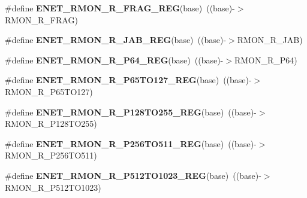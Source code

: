 \begin{DoxyCompactItemize}
\item 
\#define {\bfseries E\+N\+E\+T\+\_\+\+R\+M\+O\+N\+\_\+\+R\+\_\+\+F\+R\+A\+G\+\_\+\+R\+EG}(base)~((base)-\/$>$R\+M\+O\+N\+\_\+\+R\+\_\+\+F\+R\+AG)\hypertarget{group__ENET__Register__Accessor__Macros_gab2e82b83e09c4b55699908a92d7d95e4}{}\label{group__ENET__Register__Accessor__Macros_gab2e82b83e09c4b55699908a92d7d95e4}

\item 
\#define {\bfseries E\+N\+E\+T\+\_\+\+R\+M\+O\+N\+\_\+\+R\+\_\+\+J\+A\+B\+\_\+\+R\+EG}(base)~((base)-\/$>$R\+M\+O\+N\+\_\+\+R\+\_\+\+J\+AB)\hypertarget{group__ENET__Register__Accessor__Macros_gabcec6f14a6fb78aac07bd6245aa705af}{}\label{group__ENET__Register__Accessor__Macros_gabcec6f14a6fb78aac07bd6245aa705af}

\item 
\#define {\bfseries E\+N\+E\+T\+\_\+\+R\+M\+O\+N\+\_\+\+R\+\_\+\+P64\+\_\+\+R\+EG}(base)~((base)-\/$>$R\+M\+O\+N\+\_\+\+R\+\_\+\+P64)\hypertarget{group__ENET__Register__Accessor__Macros_gae8862aa6875b7d79e922251e3300b1d4}{}\label{group__ENET__Register__Accessor__Macros_gae8862aa6875b7d79e922251e3300b1d4}

\item 
\#define {\bfseries E\+N\+E\+T\+\_\+\+R\+M\+O\+N\+\_\+\+R\+\_\+\+P65\+T\+O127\+\_\+\+R\+EG}(base)~((base)-\/$>$R\+M\+O\+N\+\_\+\+R\+\_\+\+P65\+T\+O127)\hypertarget{group__ENET__Register__Accessor__Macros_ga245c663daff3ae4e24c1565a472beef0}{}\label{group__ENET__Register__Accessor__Macros_ga245c663daff3ae4e24c1565a472beef0}

\item 
\#define {\bfseries E\+N\+E\+T\+\_\+\+R\+M\+O\+N\+\_\+\+R\+\_\+\+P128\+T\+O255\+\_\+\+R\+EG}(base)~((base)-\/$>$R\+M\+O\+N\+\_\+\+R\+\_\+\+P128\+T\+O255)\hypertarget{group__ENET__Register__Accessor__Macros_gab44d15a22c36cf909253d09685f6074a}{}\label{group__ENET__Register__Accessor__Macros_gab44d15a22c36cf909253d09685f6074a}

\item 
\#define {\bfseries E\+N\+E\+T\+\_\+\+R\+M\+O\+N\+\_\+\+R\+\_\+\+P256\+T\+O511\+\_\+\+R\+EG}(base)~((base)-\/$>$R\+M\+O\+N\+\_\+\+R\+\_\+\+P256\+T\+O511)\hypertarget{group__ENET__Register__Accessor__Macros_ga352e1b10b2c976bd3155713831144976}{}\label{group__ENET__Register__Accessor__Macros_ga352e1b10b2c976bd3155713831144976}

\item 
\#define {\bfseries E\+N\+E\+T\+\_\+\+R\+M\+O\+N\+\_\+\+R\+\_\+\+P512\+T\+O1023\+\_\+\+R\+EG}(base)~((base)-\/$>$R\+M\+O\+N\+\_\+\+R\+\_\+\+P512\+T\+O1023)\hypertarget{group__ENET__Register__Accessor__Macros_ga5efb8390da42bdb75581c0c08164a72c}{}\label{group__ENET__Register__Accessor__Macros_ga5efb8390da42bdb75581c0c08164a72c}


\end{DoxyCompactItemize}
